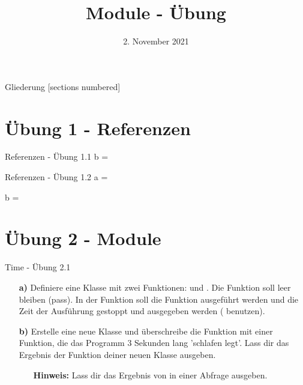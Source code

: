 



\title{Module - Übung}
\date{2. November 2021}


\maketitle

\begin{frame}{Gliederung}
	[sections numbered]
	\tableofcontents
\end{frame}

\section{Übung 1 - Referenzen}
\begin{frame}{Referenzen - Übung 1.1}
	\large
	b = \only<2>{\alert{2}}
\end{frame}
\begin{frame}{Referenzen - Übung 1.2}
	\large
	a = \only<1>{?}\only<2>{\alert{[1, 2, [1, 2, [1, 2, ...]]]}}
	
	b = \only<2>{\alert{1}}
\end{frame}

\section{Übung 2 - Module}
\begin{frame}{Time - Übung 2.1}
	\begin{itemize}
		\item[\textbf{a)}]Definiere eine Klasse  mit zwei Funktionen:  und . Die  Funktion soll leer bleiben (pass). In der  Funktion soll die  Funktion ausgeführt werden und die Zeit der Ausführung gestoppt und ausgegeben werden ( benutzen).
		\linebreak
		
		\item[\textbf{b)}]Erstelle eine neue Klasse und überschreibe die  Funktion mit einer Funktion, die das Programm 3 Sekunden lang 'schlafen legt'. Lass dir das Ergebnis der  Funktion deiner neuen Klasse ausgeben. 
		\linebreak
		\begin{itemize}
			\item[\textbf{Hinweis:}] Lass dir das Ergebnis von  in einer  Abfrage ausgeben.
		\end{itemize}
	\end{itemize}
\end{frame}

